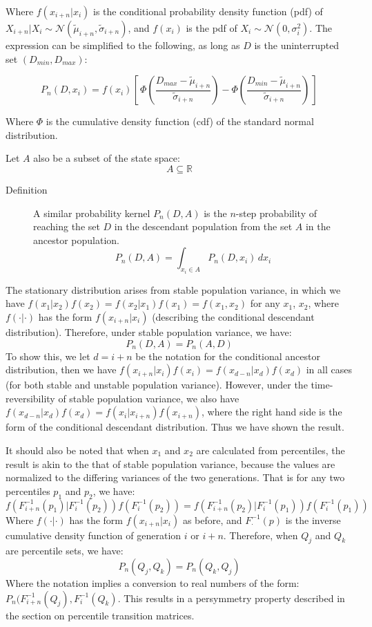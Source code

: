 \documentclass[a4paper,11pt]{article} %
\begin{document}
Where $f(x_{i+n}|x_i)$ is the conditional probability density function (pdf) of $X_{i+n}|X_i \sim \mathcal{N}( \tilde{\mu}_{i+n}, \tilde{\sigma}_{i+n})$, and $f(x_i)$ is the pdf of $X_i \sim \mathcal{N}(0, \sigma_i^2)$.
The expression can be simplified to the following, as long as $D$ is the uninterrupted set $(D_{min}, D_{max})$:

$$P_n(D, x_i) = f(x_i)[\, \Phi(\frac{D_{max}- \tilde{\mu}_{i+n}}{\tilde{\sigma}_{i+n}}) - \Phi(\frac{D_{min}- \tilde{\mu}_{i+n}}{\tilde{\sigma}_{i+n}}) \, ]$$

Where $\Phi$ is the cumulative density function (cdf) of the standard normal distribution. 

Let $A$ also be a subset of the state space:
%
$$A \subseteq \mathbb{R}$$

\begin{description}
\item [Definition] A similar probability kernel $P_n(D, A)$ is the $n$-step probability of reaching the set $D$ in the descendant population from the set $A$ in the ancestor population. 
$$P_n(D, A) = \int_{x_i\in A}^{} P_n(D, x_i) \, dx_i$$
\end{description}

The stationary distribution arises from stable population variance, in which we have $f(x_1|x_2)f(x_2) = f(x_2|x_1)f(x_1) = f(x_1, x_2)$ for any $x_1$, $x_2$, where $f(\cdot|\cdot)$ has the form $f(x_{i+n}|x_i)$ (describing the conditional descendant distribution). Therefore, under stable population variance, we have: 
$$P_n(D, A) = P_n(A, D)$$
To show this, we let $d = i+n$ be the notation for the conditional ancestor distribution, then we have $f(x_{i+n}|x_i)f(x_i) = f(x_{d-n}|x_d)f(x_d)$ in all cases (for both stable and unstable population variance). However, under the time-reversibility of stable population variance, we also have $f(x_{d-n}|x_d)f(x_d) = f(x_{i}|x_{i+n})f(x_{i+n})$, where the right hand side is the form of the conditional descendant distribution. Thus we have shown the result. 

It should also be noted that when $x_1$ and $x_2$ are calculated from percentiles, the result is akin to the that of stable population variance, because the values are normalized to the differing variances of the two generations. That is for any two percentiles $p_1$ and $p_2$, we have: 
$$f(F_{i+n}^{-1}(p_1)|F_i^{-1}(p_2))f(F_i^{-1}(p_2)) = f(F_{i+n}^{-1}(p_2)|F_i^{-1}(p_1))f(F_i^{-1}(p_1))$$
Where $f(\cdot|\cdot)$ has the form $f(x_{i+n}|x_i)$ as before, and $F_{\cdot}^{-1}(p)$ is the inverse cumulative density function of generation $i$ or $i+n$. Therefore, when $Q_j$ and $Q_k$ are percentile sets, we have:
$$P_n(Q_j, Q_k) = P_n(Q_k, Q_j)$$ 
Where the notation implies a conversion to real numbers of the form: $P_n(F_{i+n}^{-1}(Q_j), F_i^{-1}(Q_k)$. This results in a persymmetry property described in the section on percentile transition matrices. 
\end{document}
